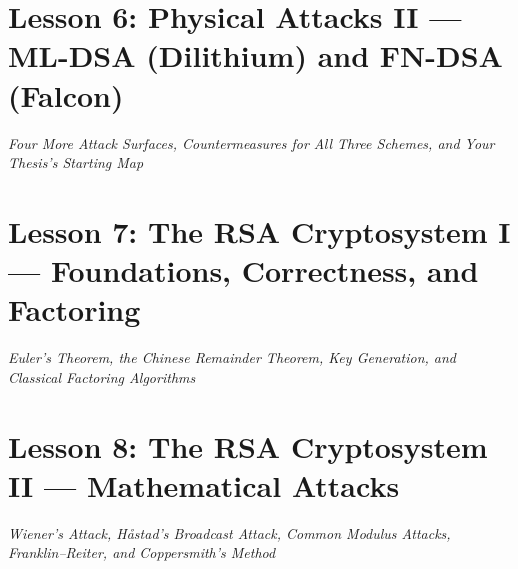 \documentclass[11pt,a4paper,oneside]{book}
\begin{document}
\chapter{Lesson 6: Physical Attacks II --- ML-DSA (Dilithium) and FN-DSA (Falcon)}
\begin{center}
\large\itshape Four More Attack Surfaces, Countermeasures for All Three Schemes, and Your Thesis's Starting Map
\end{center}
\vspace{0.4cm}


\chapter{Lesson 7: The RSA Cryptosystem I --- Foundations, Correctness, and Factoring}
\begin{center}
\large\itshape Euler's Theorem, the Chinese Remainder Theorem, Key Generation, and Classical Factoring Algorithms
\end{center}
\vspace{0.4cm}


\chapter{Lesson 8: The RSA Cryptosystem II --- Mathematical Attacks}
\begin{center}
\large\itshape Wiener's Attack, Håstad's Broadcast Attack, Common Modulus Attacks, Franklin--Reiter, and Coppersmith's Method
\end{center}
\vspace{0.4cm}

\end{document}
